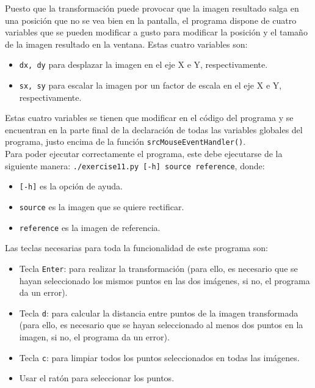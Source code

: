 \documentclass[a4paper,10pt,titlepage,oneside,openright]{book}
\begin{document}
Puesto que la transformación puede provocar que la imagen resultado salga en una posición que no se vea bien en la pantalla, el programa dispone de cuatro variables que se pueden modificar a gusto para modificar la posición y el tamaño de la imagen resultado en la ventana. Estas cuatro variables son:
\begin{itemize}
 \item \texttt{dx, dy} para desplazar la imagen en el eje X e Y, respectivamente.
 \item \texttt{sx, sy} para escalar la imagen por un factor de escala en el eje X e Y, respectivamente.
\end{itemize}
Estas cuatro variables se tienen que modificar en el código del programa y se encuentran en la parte final de la declaración de todas las variables globales del programa, justo encima de la función \texttt{srcMouseEventHandler()}. \\

Para poder ejecutar correctamente el programa, este debe ejecutarse de la siguiente manera: \texttt{./exercise11.py [-h] source reference}, donde:
\begin{itemize}
 \item \texttt{[-h]} es la opción de ayuda.
 \item \texttt{source} es la imagen que se quiere rectificar.
 \item \texttt{reference} es la imagen de referencia.
\end{itemize}

Las teclas necesarias para toda la funcionalidad de este programa son:
\begin{itemize}
 \item Tecla \texttt{Enter}: para realizar la transformación (para ello, es necesario que se hayan seleccionado los mismos puntos en las dos imágenes, si no, el programa da un error).
 \item Tecla \texttt{d}: para calcular la distancia entre puntos de la imagen transformada (para ello, es necesario que se hayan seleccionado al menos dos puntos en la imagen, si no, el programa da un error).
 \item Tecla \texttt{c}: para limpiar todos los puntos seleccionados en todas las imágenes.
 \item Usar el ratón para seleccionar los puntos.
\end{itemize}




\medskip
\end{document}
